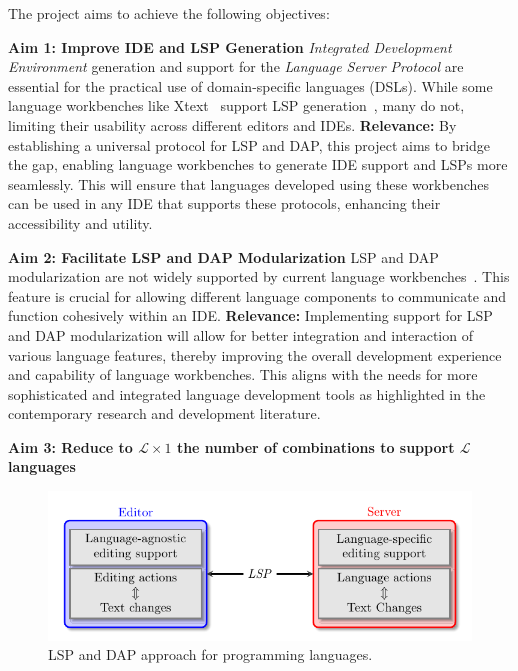 \hfill \break
The project aims to achieve the following objectives:

\hfill \break
\noindent
\textbf{Aim 1: Improve IDE and LSP Generation}
\hfill \break
\textit{Integrated Development Environment} generation and support for the \textit{Language Server Protocol} are essential for the practical use of domain-specific languages (DSLs). While some language workbenches like Xtext~\cite{Bettini13b} support LSP generation~\cite{Barros22}, many do not, limiting their usability across different editors and IDEs.
\hfill \break
\textbf{Relevance:} By establishing a universal protocol for LSP and DAP, this project aims to bridge the gap, enabling language workbenches to generate IDE support and LSPs more seamlessly. This will ensure that languages developed using these workbenches can be used in any IDE that supports these protocols, enhancing their accessibility and utility.

\hfill \break
\noindent
\textbf{Aim 2: Facilitate LSP and DAP Modularization}
\hfill \break
LSP and DAP modularization are not widely supported by current language workbenches~\cite{Bunder19a}. This feature is crucial for allowing different language components to communicate and function cohesively within an IDE.
\hfill \break
\textbf{Relevance:} Implementing support for LSP and DAP modularization will allow for better integration and interaction of various language features, thereby improving the overall development experience and capability of language workbenches. This aligns with the needs for more sophisticated and integrated language development tools as highlighted in the contemporary research and development literature.

\hfill \break
\noindent
\textbf{Aim 3: Reduce to $\mathcal{L} \times 1$ the number of combinations to support $\mathcal{L}$ languages}

\begin{figure}[t]
    \centering
    \includegraphics[width=0.75\linewidth]{figs/lsp_agnostic.pdf}
    \caption{LSP and DAP approach for programming languages.}
    \label{fig:agnostic}
\end{figure}

